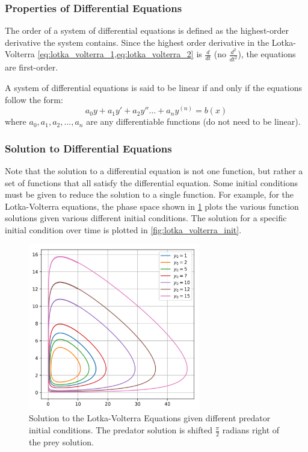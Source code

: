 \subsubsection{Properties of Differential Equations}
\label{subsubsection:properties_differential}
\begin{definition}
    The order of a system of differential equations is defined as the highest-order derivative the system contains. Since the highest order derivative in the Lotka-Volterra \cref{eq:lotka_volterra_1,eq:lotka_volterra_2} is $\frac{d}{dt}$ (no $\frac{d^2}{{dt}^2}$), the equations are first-order.
\end{definition}

\begin{definition}
    A system of differential equations is said to be linear if and only if the equations follow the form:
    \[ a_0 y + a_1 y' + a_2 y'' \dots + a_n y^{(n)} = b(x) \]
    \noindent
    where $a_0, a_1, a_2, ..., a_n$ are any differentiable functions (do not need to be linear).
\end{definition}

\subsubsection{Solution to Differential Equations}
Note that the solution to a differential equation is not one function, but rather a set of functions that all satisfy the differential equation. Some initial conditions must be given to reduce the solution to a single function. For example, for the Lotka-Volterra equations, the phase space shown in \cref{fig:lotka_volterra_phase} plots the various function solutions given various different initial conditions. The solution for a specific initial condition over time is plotted in \cref{fig:lotka_volterra_init}.

\begin{figure}[H]
    \centering
    \includegraphics[width=75mm,height=\textheight,keepaspectratio]{images/Predator_prey_dynamics.png}
    \caption{Solution to the Lotka-Volterra Equations given different predator initial conditions. The predator solution is shifted $\frac{\pi}{2}$ radians right of the prey solution.}
    \label{fig:lotka_volterra_phase}
\end{figure}

